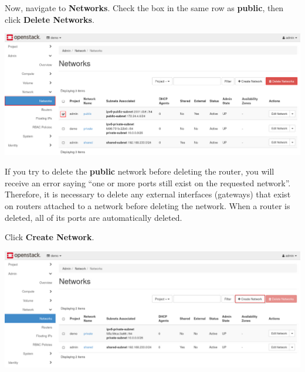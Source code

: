 \documentclass[letterpaper, 12pt]{article}
\begin{document}
\begin{enumerate}
    \begin{labstep}
        Now, navigate to \textbf{Networks}.
        Check the box in the same row as \textbf{public}, then click
        \textbf{Delete Networks}.

        \begin{center}
            \includegraphics[width=\linewidth]{images/part1/step5.png}
        \end{center}
    \end{labstep}

    \begin{notebox}
        If you try to delete the \textbf{public} network before deleting the router, you will receive an error saying ``one or more ports still exist on the requested network''.
        Therefore, it is necessary to delete any external interfaces (gateways) that exist on routers attached to a network before deleting the network.
        When a router is deleted, all of its ports are automatically deleted.
    \end{notebox}

    \begin{labstep}
        Click \textbf{Create Network}.

        \begin{center}
            \includegraphics[width=\linewidth]{images/part1/step6.png}
        \end{center}
    \end{labstep}


\end{enumerate}
\end{document}
